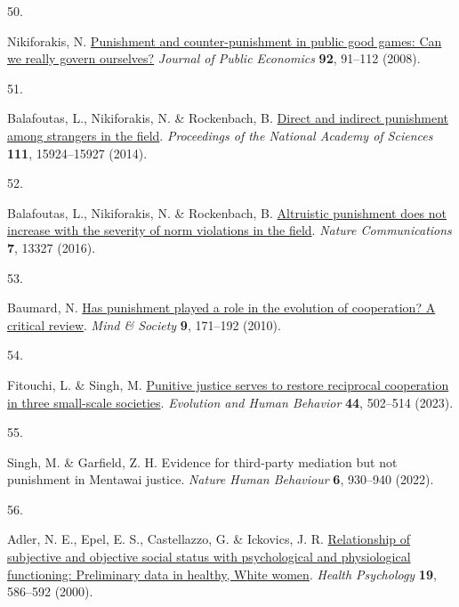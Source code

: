 \documentclass[
  man,floatsintext]{apa6}
\newlength{\cslhangindent}
\newlength{\csllabelwidth}
\newlength{\cslentryspacingunit} %
\newenvironment{CSLReferences}[2] %
 {%
  \setlength{\parindent}{0pt}
  \ifodd #1
  \let\oldpar\par
  \def\par{\hangindent=\cslhangindent\oldpar}
  \fi
  \setlength{\parskip}{#2\cslentryspacingunit}
 }%
 {}
\newcommand{\CSLLeftMargin}[1]{\parbox[t]{\csllabelwidth}{#1}}
\newcommand{\CSLRightInline}[1]{\parbox[t]{\linewidth - \csllabelwidth}{#1}\break}
\begin{document}
\begin{CSLReferences}{0}{0}
\leavevmode{}%
\CSLLeftMargin{50. }%
\CSLRightInline{Nikiforakis, N. \href{https://doi.org/10.1016/j.jpubeco.2007.04.008}{Punishment and counter-punishment in public good games: Can we really govern ourselves?} \emph{Journal of Public Economics} \textbf{92}, 91--112 (2008).}

\leavevmode{}%
\CSLLeftMargin{51. }%
\CSLRightInline{Balafoutas, L., Nikiforakis, N. \& Rockenbach, B. \href{https://doi.org/10.1073/pnas.1413170111}{Direct and indirect punishment among strangers in the field}. \emph{Proceedings of the National Academy of Sciences} \textbf{111}, 15924--15927 (2014).}

\leavevmode{}%
\CSLLeftMargin{52. }%
\CSLRightInline{Balafoutas, L., Nikiforakis, N. \& Rockenbach, B. \href{https://doi.org/10.1038/ncomms13327}{Altruistic punishment does not increase with the severity of norm violations in the field}. \emph{Nature Communications} \textbf{7}, 13327 (2016).}

\leavevmode{}%
\CSLLeftMargin{53. }%
\CSLRightInline{Baumard, N. \href{https://doi.org/10.1007/s11299-010-0079-9}{Has punishment played a role in the evolution of cooperation? A critical review}. \emph{Mind \& Society} \textbf{9}, 171--192 (2010).}

\leavevmode{}%
\CSLLeftMargin{54. }%
\CSLRightInline{Fitouchi, L. \& Singh, M. \href{https://doi.org/10.1016/j.evolhumbehav.2023.03.001}{Punitive justice serves to restore reciprocal cooperation in three small-scale societies}. \emph{Evolution and Human Behavior} \textbf{44}, 502--514 (2023).}

\leavevmode{}%
\CSLLeftMargin{55. }%
\CSLRightInline{Singh, M. \& Garfield, Z. H. Evidence for third-party mediation but not punishment in {M}entawai justice. \emph{Nature Human Behaviour} \textbf{6}, 930--940 (2022).}

\leavevmode{}%
\CSLLeftMargin{56. }%
\CSLRightInline{Adler, N. E., Epel, E. S., Castellazzo, G. \& Ickovics, J. R. \href{https://doi.org/10.1037/0278-6133.19.6.586}{Relationship of subjective and objective social status with psychological and physiological functioning: Preliminary data in healthy, {W}hite women}. \emph{Health Psychology} \textbf{19}, 586--592 (2000).}


\end{CSLReferences}
\end{document}
